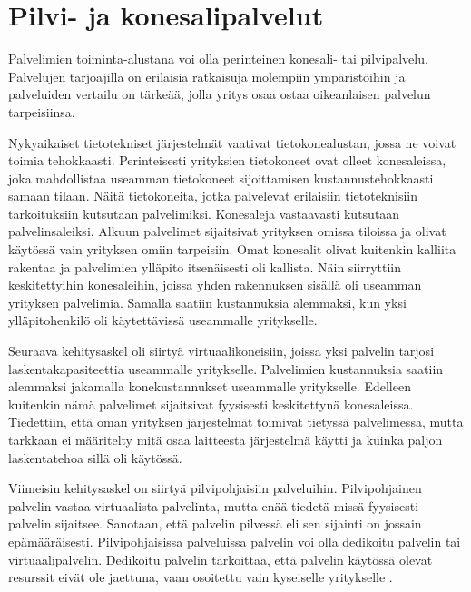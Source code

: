 \chapter{Pilvi- ja konesalipalvelut\label{konesalipalvelut}}
Palvelimien toiminta-alustana voi olla perinteinen konesali- tai pilvipalvelu. Palvelujen tarjoajilla on erilaisia ratkaisuja molempiin ympäristöihin ja palveluiden vertailu on tärkeää, jolla yritys osaa ostaa oikeanlaisen palvelun tarpeisiinsa. 

Nykyaikaiset tietotekniset järjestelmät vaativat tietokonealustan, jossa ne voivat toimia tehokkaasti. Perinteisesti yrityksien tietokoneet ovat olleet konesaleissa, joka mahdollistaa useamman tietokoneet sijoittamisen kustannustehokkaasti samaan tilaan. Näitä tietokoneita, jotka palvelevat erilaisiin tietoteknisiin tarkoituksiin kutsutaan palvelimiksi. \citep{server_computing} Konesaleja vastaavasti kutsutaan palvelinsaleiksi. Alkuun palvelimet sijaitsivat yrityksen omissa tiloissa ja olivat käytössä vain yrityksen omiin tarpeisiin. Omat konesalit olivat kuitenkin kalliita rakentaa ja palvelimien ylläpito itsenäisesti oli kallista. Näin siirryttiin keskitettyihin konesaleihin, joissa yhden rakennuksen sisällä oli useamman yrityksen palvelimia. Samalla saatiin kustannuksia alemmaksi, kun yksi ylläpitohenkilö oli käytettävissä useammalle yritykselle. \citep{server_room}

Seuraava kehitysaskel oli siirtyä virtuaalikoneisiin, joissa yksi palvelin tarjosi laskentakapasiteettia useammalle yritykselle. Palvelimien kustannuksia saatiin alemmaksi jakamalla konekustannukset useammalle yritykselle. Edelleen kuitenkin nämä palvelimet sijaitsivat fyysisesti keskitettynä konesaleissa. Tiedettiin, että oman yrityksen järjestelmät toimivat tietyssä palvelimessa, mutta tarkkaan ei määritelty mitä osaa laitteesta järjestelmä käytti ja kuinka paljon laskentatehoa sillä oli käytössä.\citep{virtual_server}

Viimeisin kehitysaskel on siirtyä pilvipohjaisiin palveluihin. Pilvipohjainen palvelin vastaa virtuaalista palvelinta, mutta enää tiedetä missä fyysisesti palvelin sijaitsee. \citep{cloud_computing} Sanotaan, että palvelin pilvessä eli sen sijainti on jossain epämääräisesti. Pilvipohjaisissa palveluissa palvelin voi olla dedikoitu palvelin tai virtuaalipalvelin. Dedikoitu palvelin tarkoittaa, että palvelin käytössä olevat resurssit eivät ole jaettuna, vaan osoitettu vain kyseiselle yritykselle \citep{dedicated_hosting}.

